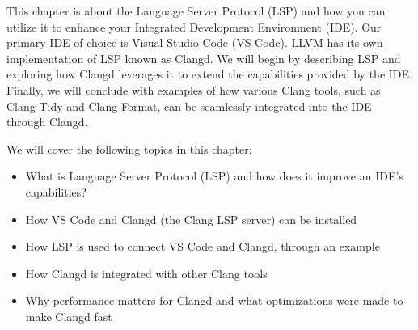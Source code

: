 This chapter is about the Language Server Protocol (LSP) and how you can utilize it to enhance your Integrated Development Environment (IDE). Our primary IDE of choice is Visual Studio Code (VS Code). LLVM has its own implementation of LSP known as Clangd. We will begin by describing LSP and exploring how Clangd leverages it to extend the capabilities provided by the IDE. Finally, we will conclude with examples of how various Clang tools, such as Clang-Tidy and Clang-Format, can be seamlessly integrated into the IDE through Clangd.

We will cover the following topics in this chapter:

\begin{itemize}
\item
What is Language Server Protocol (LSP) and how does it improve an IDE's capabilities?

\item
How VS Code and Clangd (the Clang LSP server) can be installed

\item
How LSP is used to connect VS Code and Clangd, through an example

\item
How Clangd is integrated with other Clang tools

\item
Why performance matters for Clangd and what optimizations were made to make Clangd fast
\end{itemize}
